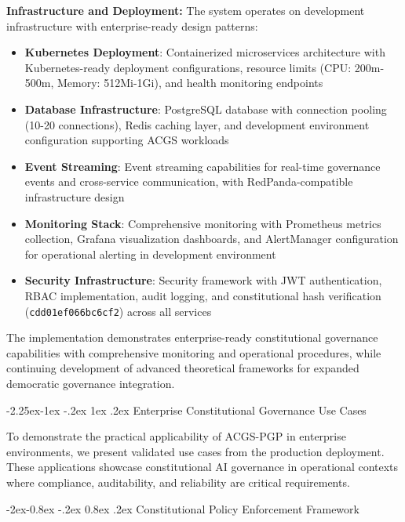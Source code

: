 \documentclass[manuscript,screen,9pt]{acmart}
\makeatletter
\renewcommand\subsection{\@startsection{subsection}{2}{\z@}%
  {-2.25ex\@plus -1ex \@minus -.2ex}%
  {1ex \@plus .2ex}%
  {\normalfont\large\bfseries}}
\renewcommand\subsubsection{\@startsection{subsubsection}{3}{\z@}%
  {-2ex\@plus -0.8ex \@minus -.2ex}%
  {0.8ex \@plus .2ex}%
  {\normalfont\normalsize\bfseries}}
\makeatother
\begin{document}
\textbf{Infrastructure and Deployment:}
The system operates on development infrastructure with enterprise-ready design patterns:
\begin{itemize}[leftmargin=*,itemsep=1pt,parsep=1pt]
    \item \textbf{Kubernetes Deployment}: Containerized microservices architecture with Kubernetes-ready deployment configurations, resource limits (CPU: 200m-500m, Memory: 512Mi-1Gi), and health monitoring endpoints
    \item \textbf{Database Infrastructure}: PostgreSQL database with connection pooling (10-20 connections), Redis caching layer, and development environment configuration supporting ACGS workloads
    \item \textbf{Event Streaming}: Event streaming capabilities for real-time governance events and cross-service communication, with RedPanda-compatible infrastructure design
    \item \textbf{Monitoring Stack}: Comprehensive monitoring with Prometheus metrics collection, Grafana visualization dashboards, and AlertManager configuration for operational alerting in development environment
    \item \textbf{Security Infrastructure}: Security framework with JWT authentication, RBAC implementation, audit logging, and constitutional hash verification (\texttt{cdd01ef066bc6cf2}) across all services
\end{itemize}

The implementation demonstrates enterprise-ready constitutional governance capabilities with comprehensive monitoring and operational procedures, while continuing development of advanced theoretical frameworks for expanded democratic governance integration.

\subsection{Enterprise Constitutional Governance Use Cases}
\label{subsec:enterprise_use_cases}

To demonstrate the practical applicability of ACGS-PGP in enterprise environments, we present validated use cases from the production deployment. These applications showcase constitutional AI governance in operational contexts where compliance, auditability, and reliability are critical requirements.

\subsubsection{Constitutional Policy Enforcement Framework}
\label{subsubsec:policy_enforcement_framework}
\end{document}

